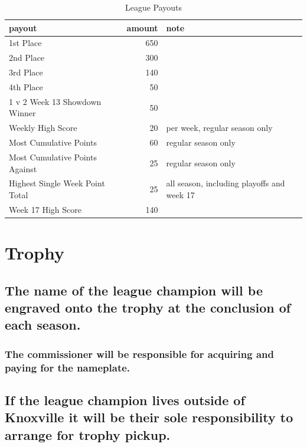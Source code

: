 \documentclass[]{book}
\begin{document}
\begin{table}[t]

\caption{\label{tab:unnamed-chunk-7}League Payouts}
\centering
\begin{tabular}{lrl}
\toprule
payout & amount & note\\
\midrule
1st Place & 650 & \\
2nd Place & 300 & \\
3rd Place & 140 & \\
4th Place & 50 & \\
1 v 2 Week 13 Showdown Winner & 50 & \\
\addlinespace
Weekly High Score & 20 & per week, regular season only\\
Most Cumulative Points & 60 & regular season only\\
Most Cumulative Points Against & 25 & regular season only\\
Highest Single Week Point Total & 25 & all season, including playoffs and week 17\\
Week 17 High Score & 140 & \\
\bottomrule
\end{tabular}
\end{table}

\hypertarget{trophy}{%
\section{Trophy}\label{trophy}}

\hypertarget{the-name-of-the-league-champion-will-be-engraved-onto-the-trophy-at-the-conclusion-of-each-season.}{%
\subsection{The name of the league champion will be engraved onto the trophy at the conclusion of each season.}\label{the-name-of-the-league-champion-will-be-engraved-onto-the-trophy-at-the-conclusion-of-each-season.}}

\hypertarget{the-commissioner-will-be-responsible-for-acquiring-and-paying-for-the-nameplate.}{%
\subsubsection{The commissioner will be responsible for acquiring and paying for the nameplate.}\label{the-commissioner-will-be-responsible-for-acquiring-and-paying-for-the-nameplate.}}

\hypertarget{if-the-league-champion-lives-outside-of-knoxville-it-will-be-their-sole-responsibility-to-arrange-for-trophy-pickup.}{%
\subsection{If the league champion lives outside of Knoxville it will be their sole responsibility to arrange for trophy pickup.}\label{if-the-league-champion-lives-outside-of-knoxville-it-will-be-their-sole-responsibility-to-arrange-for-trophy-pickup.}}
\end{document}
